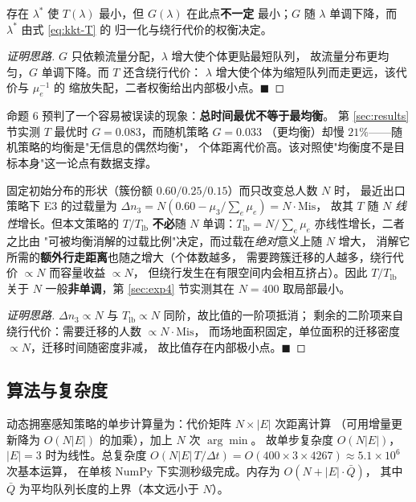 \begin{csfprop}[命题 6（效率与均衡度的非单调关系）]
\label{prop:nonmono}
存在 $\lambda^\ast$ 使 $T(\lambda)$ 最小，但 $G(\lambda)$ 在此点\textbf{不一定}
最小；$G$ 随 $\lambda$ 单调下降，而 $\lambda^\ast$ 由式 \eqref{eq:kkt-T} 的
归一化与绕行代价的权衡决定。
\end{csfprop}
\begin{proof}[证明思路]
$G$ 只依赖流量分配，$\lambda$ 增大使个体更贴最短队列，
故流量分布更均匀，$G$ 单调下降。而 $T$ 还含绕行代价：
$\lambda$ 增大使个体为缩短队列而走更远，该代价与 $\mu_e^{-1}$ 的
缩放失配，二者权衡给出内部极小点。\hfill$\blacksquare$
\end{proof}

命题 6 预判了一个容易被误读的现象：\textbf{总时间最优不等于最均衡}。
第 \ref{sec:results} 节实测 $T$ 最优时 $G=0.083$，而随机策略 $G=0.033$
（更均衡）却慢 $21\%$——随机策略的均衡是"无信息的偶然均衡"，
个体距离代价高。该对照使"均衡度不是目标本身"这一论点有数据支撑。

\begin{csfprop}[命题 7（规模效应的非单调性由错配度决定）]
\label{prop:misalign}
固定初始分布的形状（簇份额 $0.60/0.25/0.15$）而只改变总人数 $N$ 时，
最近出口策略下 E3 的过载量为 $\Delta n_3=N(0.60-\mu_3/\sum_e\mu_e)=N\cdot\mathrm{Mis}$，
故其 $T$ 随 $N$ \emph{线性}增长。但本文策略的 $T/T_{\mathrm{lb}}$ \textbf{不必}随 $N$
单调：$T_{\mathrm{lb}}=N/\sum_e\mu_e$ 亦线性增长，二者之比由
"可被均衡消解的过载比例"决定，而过载在\emph{绝对}意义上随 $N$ 增大，
消解它所需的\textbf{额外行走距离}也随之增大（个体数越多，
需要跨簇迁移的人越多，绕行代价 $\propto N$ 而容量收益 $\propto N$，
但绕行发生在有限空间内会相互挤占）。因此 $T/T_{\mathrm{lb}}$ 关于 $N$
一般\textbf{非单调}，第 \ref{sec:exp4} 节实测其在 $N=400$ 取局部最小。
\end{csfprop}
\begin{proof}[证明思路]
$\Delta n_3\propto N$ 与 $T_{\mathrm{lb}}\propto N$ 同阶，故比值的一阶项抵消；
剩余的二阶项来自绕行代价：需要迁移的人数 $\propto N\cdot\mathrm{Mis}$，
而场地面积固定，单位面积的迁移密度 $\propto N$，迁移时间随密度非减，
故比值存在内部极小点。\hfill$\blacksquare$
\end{proof}

\subsection{算法与复杂度}
\label{sec:algo}

动态拥塞感知策略的单步计算量为：代价矩阵 $N\times|E|$ 次距离计算
（可用增量更新降为 $O(N|E|)$ 的加乘），加上 $N$ 次 $\arg\min$。
故单步复杂度 $O(N|E|)$，$|E|=3$ 时为线性。总复杂度
$O(N|E|\,T/\Delta t)=O(400\times3\times4267)\approx5.1\times10^{6}$ 次基本运算，
在单核 NumPy 下实测秒级完成。内存为 $O(N+|E|\cdot\bar Q)$，
其中 $\bar Q$ 为平均队列长度的上界（本文远小于 $N$）。

